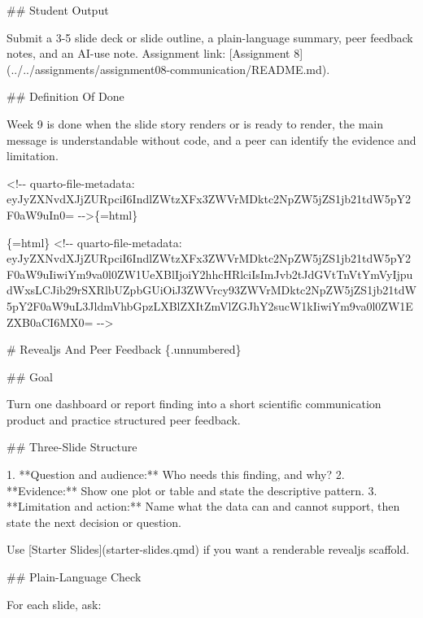 \documentclass[
  letterpaper,
  DIV=11,
  numbers=noendperiod,
  oneside]{scrreprt}
\newenvironment{Shaded}{\begin{snugshade}}{\end{snugshade}}
\newcommand{\CommentTok}[1]{\textcolor[rgb]{0.37,0.37,0.37}{#1}}
\newcommand{\FunctionTok}[1]{\textcolor[rgb]{0.28,0.35,0.67}{#1}}
\newcommand{\InformationTok}[1]{\textcolor[rgb]{0.37,0.37,0.37}{#1}}
\newcommand{\NormalTok}[1]{\textcolor[rgb]{0.00,0.23,0.31}{#1}}
\newcommand{\OtherTok}[1]{\textcolor[rgb]{0.00,0.23,0.31}{#1}}
\newcommand{\SpecialStringTok}[1]{\textcolor[rgb]{0.13,0.47,0.30}{#1}}
\begin{document}
\begin{Shaded}
\begin{Highlighting}[numbers=left,,]
\FunctionTok{\#\# Student Output}

\NormalTok{Submit a 3{-}5 slide deck or slide outline, a plain{-}language summary, peer feedback notes, and an AI{-}use note. Assignment link: }\CommentTok{[}\OtherTok{Assignment 8}\CommentTok{](../../assignments/assignment08{-}communication/README.md)}\NormalTok{.}

\FunctionTok{\#\# Definition Of Done}

\NormalTok{Week 9 is done when the slide story renders or is ready to render, the main message is understandable without code, and a peer can identify the evidence and limitation.}


\InformationTok{\textasciigrave{}\textless{}!{-}{-} quarto{-}file{-}metadata: eyJyZXNvdXJjZURpciI6IndlZWtzXFx3ZWVrMDktc2NpZW5jZS1jb21tdW5pY2F0aW9uIn0= {-}{-}\textgreater{}\textasciigrave{}}\NormalTok{\{=html\}}

\InformationTok{\textasciigrave{}\textasciigrave{}\textasciigrave{}\{=html\}}
\InformationTok{\textless{}!{-}{-} quarto{-}file{-}metadata: eyJyZXNvdXJjZURpciI6IndlZWtzXFx3ZWVrMDktc2NpZW5jZS1jb21tdW5pY2F0aW9uIiwiYm9va0l0ZW1UeXBlIjoiY2hhcHRlciIsImJvb2tJdGVtTnVtYmVyIjpudWxsLCJib29rSXRlbUZpbGUiOiJ3ZWVrcy93ZWVrMDktc2NpZW5jZS1jb21tdW5pY2F0aW9uL3JldmVhbGpzLXBlZXItZmVlZGJhY2sucW1kIiwiYm9va0l0ZW1EZXB0aCI6MX0= {-}{-}\textgreater{}}
\InformationTok{\textasciigrave{}\textasciigrave{}\textasciigrave{}}

\FunctionTok{\# Revealjs And Peer Feedback \{.unnumbered\}}


\FunctionTok{\#\# Goal}

\NormalTok{Turn one dashboard or report finding into a short scientific communication product and practice structured peer feedback.}

\FunctionTok{\#\# Three{-}Slide Structure}

\SpecialStringTok{1. }\NormalTok{**Question and audience:** Who needs this finding, and why?}
\SpecialStringTok{2. }\NormalTok{**Evidence:** Show one plot or table and state the descriptive pattern.}
\SpecialStringTok{3. }\NormalTok{**Limitation and action:** Name what the data can and cannot support, then state the next decision or question.}

\NormalTok{Use }\CommentTok{[}\OtherTok{Starter Slides}\CommentTok{](starter{-}slides.qmd)}\NormalTok{ if you want a renderable revealjs scaffold.}

\FunctionTok{\#\# Plain{-}Language Check}

\NormalTok{For each slide, ask:}


\end{Highlighting}
\end{Shaded}
\end{document}
